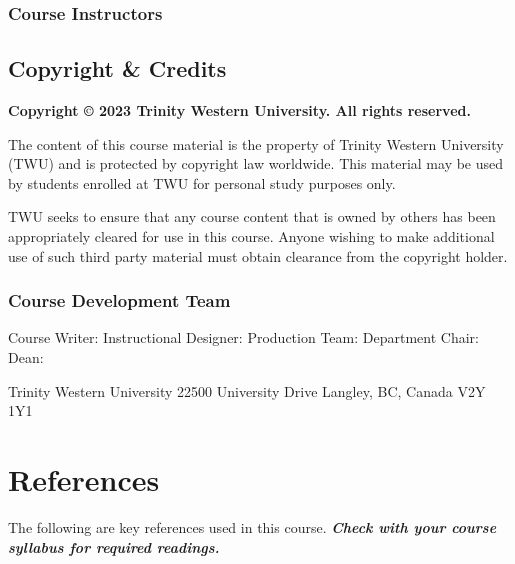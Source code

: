 \documentclass[
]{book}
\begin{document}
\hypertarget{course-instructors}{%
\subsection*{Course Instructors}\label{course-instructors}}

\hypertarget{copyright-credits}{%
\section*{Copyright \& Credits}\label{copyright-credits}}

\textbf{Copyright © 2023 Trinity Western University. All rights reserved.}

The content of this course material is the property of Trinity Western University (TWU) and is protected by copyright law worldwide. This material may be used by students enrolled at TWU for personal study purposes only.

TWU seeks to ensure that any course content that is owned by others has been appropriately cleared for use in this course. Anyone wishing to make additional use of such third party material must obtain clearance from the copyright holder.

\hypertarget{course-development-team}{%
\subsection{Course Development Team}\label{course-development-team}}

Course Writer:
Instructional Designer:
Production Team:
Department Chair:
Dean:

Trinity Western University
22500 University Drive
Langley, BC, Canada \textbar{} V2Y 1Y1

\hypertarget{references}{%
\chapter*{References}\label{references}}

The following are key references used in this course. \textbf{\emph{Check with your course syllabus for required readings.}}

  
\end{document}
